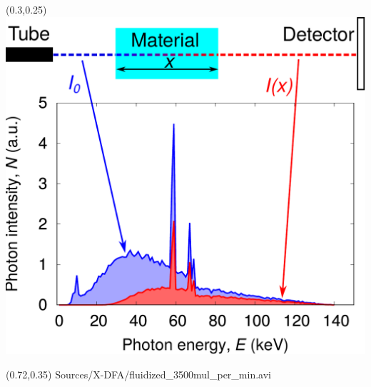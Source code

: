 \begin{frame}
\begin{textblock}{0.4}(0.3,0.25)
	\centering
	\includegraphics[width=\textwidth]
	{Sources/beam_hardening/x-ray_spectra_beam_hardening.pdf}
\end{textblock}
	
\begin{textblock}{0.25}(0.72,0.35)
	\centering
	\centering
	{Sources/X-DFA/fluidized_3500mul_per_min.avi}
\end{textblock}

\end{frame}


